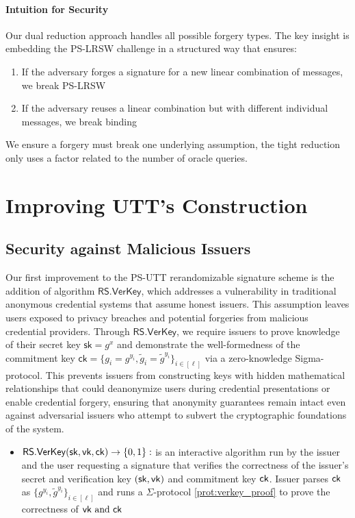 \paragraph{Intuition for Security}
Our dual reduction approach handles all possible forgery types. The key insight is embedding the PS-LRSW challenge in a structured way that ensures:
\begin{enumerate}
    \item If the adversary forges a signature for a new linear combination of messages, we break PS-LRSW
    \item If the adversary reuses a linear combination but with different individual messages, we break binding
\end{enumerate}
We ensure a forgery must break one underlying assumption, the tight reduction only uses a factor related to the number of oracle queries. 








\section{Improving UTT's Construction}



\subsection{Security against Malicious Issuers}
Our first improvement to the PS-UTT rerandomizable signature scheme is the addition of algorithm $\mathsf{RS.VerKey}$, which addresses a vulnerability in traditional anonymous credential systems that assume honest issuers. This assumption leaves users exposed to privacy breaches and potential forgeries from malicious credential providers. Through $\mathsf{RS.VerKey}$, we require issuers to prove knowledge of their secret key $\mathsf{sk} = g^x$ and demonstrate the well-formedness of the commitment key $\mathsf{ck} = \{g_i = g^{y_i}, \tilde{g}_i = \tilde{g}^{y_i}\}_{i \in [\ell]}$ via a zero-knowledge Sigma-protocol. This prevents issuers from constructing keys with hidden mathematical relationships that could deanonymize users during credential presentations or enable credential forgery, ensuring that anonymity guarantees remain intact even against adversarial issuers who attempt to subvert the cryptographic foundations of the system.

\begin{itemize}
        \item $\mathsf{RS.VerKey}(\mathsf{sk}, \mathsf{vk}, \mathsf{ck}) \to \{0,1\}:$ is an interactive algorithm run by the issuer and the user requesting a signature that verifies the correctness of the issuer's secret and verification key $(\mathsf{sk}, \mathsf{vk})$ and commitment key $\mathsf{ck}$. Issuer parses $\mathsf{ck}$ as $\{g^{y_i}, \tilde{g}^{y_i}\}_{i \in  [\ell]}$ and runs a $\Sigma$-protocol \ref{prot:verkey_proof} to prove the correctness of $\mathsf{vk}\text{ and } \mathsf{ck}$
\end{itemize}

